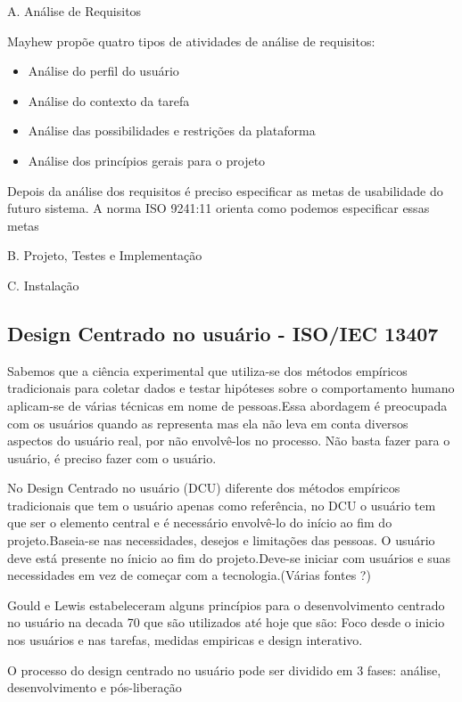 A. Análise de Requisitos

	Mayhew propõe quatro tipos de atividades de análise de requisitos: 

\begin{itemize}
\item Análise do perfil do usuário
\item Análise do contexto da tarefa
\item Análise das possibilidades e restrições da plataforma
\item Análise dos princípios gerais para o projeto
\end{itemize}

	Depois da análise dos requisitos é preciso especificar as metas de usabilidade do futuro sistema. A norma ISO 9241:11 orienta como podemos especificar essas metas

B. Projeto, Testes e Implementação

	

C. Instalação


\subsection{Design Centrado no usuário - ISO/IEC 13407}

Sabemos que a ciência experimental que utiliza-se dos métodos empíricos tradicionais para coletar dados e testar hipóteses sobre o comportamento humano aplicam-se de várias técnicas em nome de pessoas.Essa abordagem é preocupada com os usuários quando as representa mas ela não leva em conta diversos aspectos do usuário real, por não envolvê-los no processo. Não basta fazer para o usuário, é preciso fazer com o usuário. ~\cite{eason1995} 

No Design Centrado no usuário (DCU) diferente dos métodos empíricos tradicionais que tem o usuário apenas como  referência, no DCU o usuário tem que ser o elemento central e é necessário envolvê-lo do início ao fim do projeto.Baseia-se nas necessidades, desejos e limitações das pessoas. O usuário deve está presente no ínicio ao fim do projeto.Deve-se iniciar com usuários e suas necessidades em vez de começar com a tecnologia.(Várias fontes ?)

Gould e Lewis estabeleceram alguns princípios para o desenvolvimento centrado no usuário na decada 70 que são utilizados até hoje que são: Foco desde o inicio nos usuários e nas tarefas, medidas empiricas e design interativo.

O processo do design centrado no usuário pode ser dividido em 3 fases: análise, desenvolvimento e pós-liberação

